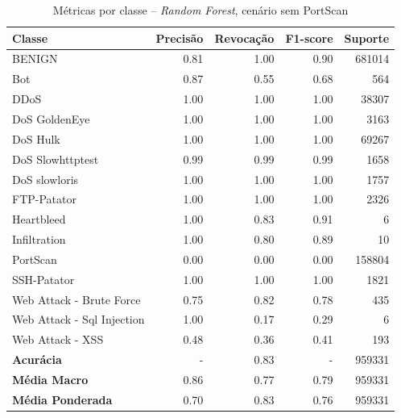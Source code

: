     \begin{table}[H]
    \centering
    \small
    \begin{tabular}{lrrrr}
        \hline
        Classe                     & Precisão & Revocação & F1-score & Suporte \\
        \hline
        BENIGN                     & 0.81     & 1.00      & 0.90     & 681014  \\
        Bot                        & 0.87     & 0.55      & 0.68     & 564     \\
        DDoS                       & 1.00     & 1.00      & 1.00     & 38307   \\
        DoS GoldenEye              & 1.00     & 1.00      & 1.00     & 3163    \\
        DoS Hulk                   & 1.00     & 1.00      & 1.00     & 69267   \\
        DoS Slowhttptest           & 0.99     & 0.99      & 0.99     & 1658    \\
        DoS slowloris              & 1.00     & 1.00      & 1.00     & 1757    \\
        FTP-Patator                & 1.00     & 1.00      & 1.00     & 2326    \\
        Heartbleed                 & 1.00     & 0.83      & 0.91     & 6       \\
        Infiltration               & 1.00     & 0.80      & 0.89     & 10      \\
        PortScan                   & 0.00     & 0.00      & 0.00     & 158804  \\
        SSH-Patator                & 1.00     & 1.00      & 1.00     & 1821    \\
        Web Attack - Brute Force   & 0.75     & 0.82      & 0.78     & 435     \\
        Web Attack - Sql Injection & 1.00     & 0.17      & 0.29     & 6       \\
        Web Attack - XSS           & 0.48     & 0.36      & 0.41     & 193     \\
        \hline
        \textbf{Acurácia}          & -        & 0.83      & -        & 959331  \\
        \textbf{Média Macro}       & 0.86     & 0.77      & 0.79     & 959331  \\
        \textbf{Média Ponderada}   & 0.70     & 0.83      & 0.76     & 959331  \\
        \hline
    \end{tabular}
    \caption{Métricas por classe -- \textit{Random Forest}, cenário sem PortScan}
    \label{table:rf_sem_portscan_metricas}
\end{table}